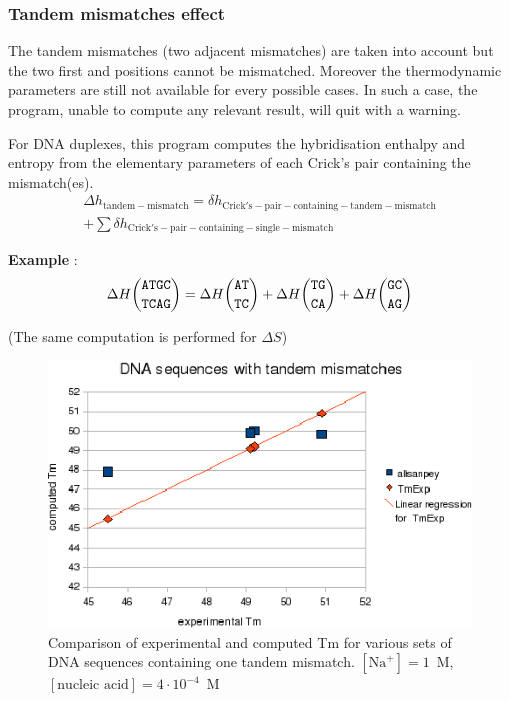 \documentclass{article}
\begin{document}
\clearpage
\subsubsection{Tandem mismatches effect}

The tandem mismatches (two adjacent mismatches) are taken into account but the two first and positions cannot
be mismatched. Moreover the thermodynamic parameters are still not available for every possible cases.
In such a case, the program, unable to compute any relevant result, will quit with a warning.

For DNA duplexes, this program computes the hybridisation enthalpy and entropy from the elementary 
parameters of each Crick's pair containing the mismatch(es). 
\begin{multline*}
\Delta{}h_\mathrm{tandem-mismatch} =
\delta{}h_\mathrm{Crick's-pair-containing-tandem-mismatch} \\ + 
\sum \delta{}h_\mathrm{Crick's-pair-containing-single-mismatch}
\end{multline*}


\textbf{Example} :
\begin{multline*}
\Delta H {\mbox{\texttt{ATGC}} \choose \mbox{\texttt{TCAG}}} = 
\Delta H {\mbox{\texttt{AT}} \choose \mbox{\texttt{TC}} } + 
\Delta H {\mbox{\texttt{TG}} \choose \mbox{\texttt{CA}} } + 
\Delta H {\mbox{\texttt{GC}} \choose \mbox{\texttt{AG}} } \\
\end{multline*}

       (The same computation is performed for $\Delta S$) 

\begin{figure}[h]
\includegraphics[width=1\linewidth]{images/DNATandemMismatch}
\caption{Comparison of experimental and computed Tm for various sets of
 DNA sequences containing one tandem mismatch. $[\mbox{Na}^+] = 1$~M, $[\mbox{nucleic acid}] = 4\cdot{}10^{-4}$~M}
\end{figure}
\end{document}
